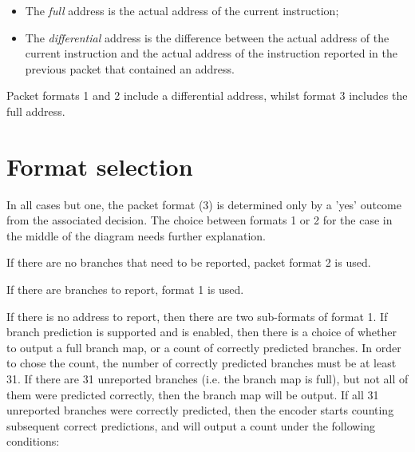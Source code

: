 \begin{itemize}
  \item The \textit{full} address is the actual address of the current instruction;
  \item The \textit{differential} address is the difference between the actual address of 
    the current instruction and the actual address of the instruction reported in the 
    previous packet that contained an address.
\end{itemize}

Packet formats 1 and 2 include a differential address, whilst format 3 includes the full address.

\section{Format selection} \label{format-selection}

In all cases but one, the packet format (3) is determined only by a 'yes' outcome from the 
associated decision.  The choice between formats 1 or 2 for the case in the middle of the 
diagram needs further explanation.  

If there are no branches that need to be reported, packet format 2 is used.  

If there are branches to report, format 1 is used.

If there is no address to report, then there are two sub-formats of format 1.  If branch prediction
is supported and is enabled, then there is a choice of whether to output a full branch map, or a 
count of correctly predicted branches.  In order to chose the count, the number of correctly
predicted branches must be at least 31.  If there are 31 unreported branches (i.e. the branch
map is full), but not all of them were predicted correctly, then the branch map will be output.
If all 31 unreported branches were correctly predicted, then the encoder starts counting
subsequent correct predictions, and will output a count under the following conditions:

